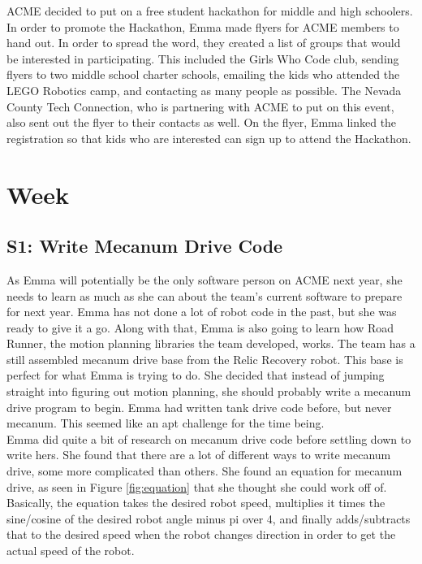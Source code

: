 \documentclass{article}
\begin{document}
ACME decided to put on a free student hackathon for middle and high schoolers. In order to promote the Hackathon, Emma made flyers for ACME members to hand out. In order to spread the word, they created a list of groups that would be interested in participating. This included the Girls Who Code club, sending flyers to two middle school charter schools, emailing the kids who attended the LEGO Robotics camp, and contacting as many people as possible. The Nevada County Tech Connection, who is partnering with ACME to put on this event, also sent out the flyer to their contacts as well. On the flyer, Emma linked the registration so that kids who are interested can sign up to attend the Hackathon. 
\clearpage \newpage \section{Week \thesection} 
\subsection{S1: Write Mecanum Drive Code}

As Emma will potentially be the only software person on ACME next year, she needs to learn as much as she can about the team's current software to prepare for next year. Emma has not done a lot of robot code in the past, but she was ready to give it a go. Along with that, Emma is also going to learn how Road Runner, the motion planning libraries the team developed, works. The team has a still assembled mecanum drive base from the Relic Recovery robot. This base is perfect for what Emma is trying to do. She decided that instead of jumping straight into figuring out motion planning, she should probably write a mecanum drive program to begin. Emma had written tank drive code before, but never mecanum. This seemed like an apt challenge for the time being. \\

Emma did quite a bit of research on mecanum drive code before settling down to write hers. She found that there are a lot of different ways to write mecanum drive, some more complicated than others. She found an equation for mecanum drive, as seen in Figure \ref{fig:equation} that she thought she could work off of. Basically, the equation takes the desired robot speed, multiplies it times the sine/cosine of the desired robot angle minus pi over 4, and finally adds/subtracts that to the desired speed when the robot changes direction in order to get the actual speed of the robot. \\
\end{document}

